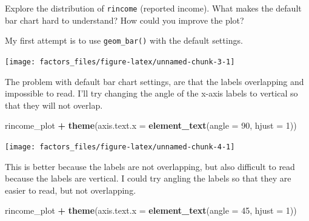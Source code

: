 \documentclass[]{book}
\newenvironment{Shaded}{\begin{snugshade}}{\end{snugshade}}
\newcommand{\DataTypeTok}[1]{\textcolor[rgb]{0.13,0.29,0.53}{#1}}
\newcommand{\DecValTok}[1]{\textcolor[rgb]{0.00,0.00,0.81}{#1}}
\newcommand{\KeywordTok}[1]{\textcolor[rgb]{0.13,0.29,0.53}{\textbf{#1}}}
\newcommand{\NormalTok}[1]{#1}
\newcommand{\OperatorTok}[1]{\textcolor[rgb]{0.81,0.36,0.00}{\textbf{#1}}}
\newcommand{\StringTok}[1]{\textcolor[rgb]{0.31,0.60,0.02}{#1}}
\theoremstyle{plain}
\theoremstyle{remark}
\begin{document}
Explore the distribution of \texttt{rincome} (reported income).
What makes the default bar chart hard to understand?
How could you improve the plot?

My first attempt is to use \texttt{geom\_bar()} with the default settings.

\begin{Shaded}
\end{Shaded}

\begin{center}\texttt{[image: factors\_files/figure-latex/unnamed-chunk-3-1]} \end{center}

The problem with default bar chart settings, are that the labels overlapping and impossible to read.
I'll try changing the angle of the x-axis labels to vertical so that they will not overlap.

\begin{Shaded}
\begin{Highlighting}[]
\NormalTok{rincome_plot }\OperatorTok{+}
\StringTok{  }\KeywordTok{theme}\NormalTok{(}\DataTypeTok{axis.text.x =} \KeywordTok{element_text}\NormalTok{(}\DataTypeTok{angle =} \DecValTok{90}\NormalTok{, }\DataTypeTok{hjust =} \DecValTok{1}\NormalTok{))}
\end{Highlighting}
\end{Shaded}

\begin{center}\texttt{[image: factors\_files/figure-latex/unnamed-chunk-4-1]} \end{center}

This is better because the labels are not overlapping, but also difficult to read because the labels are vertical.
I could try angling the labels so that they are easier to read, but not overlapping.

\begin{Shaded}
\begin{Highlighting}[]
\NormalTok{rincome_plot }\OperatorTok{+}
\StringTok{  }\KeywordTok{theme}\NormalTok{(}\DataTypeTok{axis.text.x =} \KeywordTok{element_text}\NormalTok{(}\DataTypeTok{angle =} \DecValTok{45}\NormalTok{, }\DataTypeTok{hjust =} \DecValTok{1}\NormalTok{))}
\end{Highlighting}
\end{Shaded}
\end{document}

